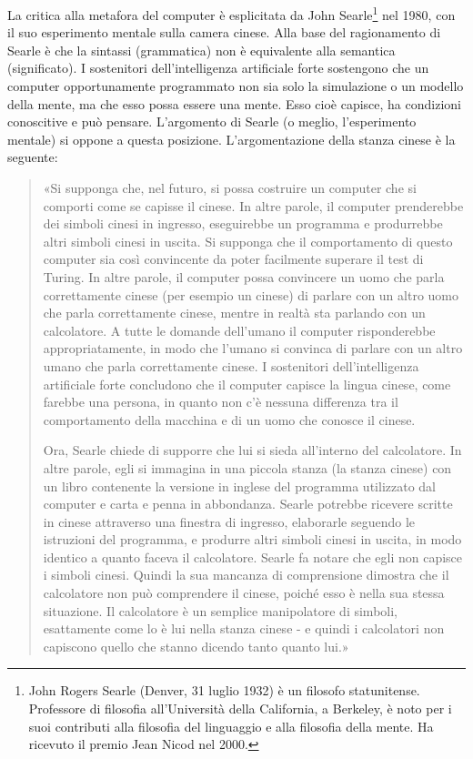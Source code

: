 La critica alla metafora del computer è esplicitata da John Searle\footnote{John Rogers Searle (Denver, 31 luglio 1932) è un filosofo statunitense. Professore di filosofia all'Università della California, a Berkeley, è noto per i suoi contributi alla filosofia del linguaggio e alla filosofia della mente. Ha ricevuto il premio Jean Nicod nel 2000.} nel 1980, con il suo esperimento mentale sulla camera cinese. Alla base del ragionamento di Searle è che la sintassi (grammatica) non è equivalente alla semantica (significato). I sostenitori dell'intelligenza artificiale forte sostengono che un computer opportunamente programmato non sia solo la simulazione o un modello della mente, ma che esso possa essere una mente. Esso cioè capisce, ha condizioni conoscitive e può pensare. L'argomento di Searle (o meglio, l'esperimento mentale) si oppone a questa posizione. L'argomentazione della stanza cinese è la seguente:

\begin{quotation}\small
  «Si supponga che, nel futuro, si possa costruire un computer che si comporti come se capisse il cinese. In altre parole, il computer prenderebbe dei simboli cinesi in ingresso, eseguirebbe un programma e produrrebbe altri simboli cinesi in uscita. Si supponga che il comportamento di questo computer sia così convincente da poter facilmente superare il test di Turing. In altre parole, il computer possa convincere un uomo che parla correttamente cinese (per esempio un cinese) di parlare con un altro uomo che parla correttamente cinese, mentre in realtà sta parlando con un calcolatore. A tutte le domande dell'umano il computer risponderebbe appropriatamente, in modo che l'umano si convinca di parlare con un altro umano che parla correttamente cinese. I sostenitori dell'intelligenza artificiale forte concludono che il computer capisce la lingua cinese, come farebbe una persona, in quanto non c'è nessuna differenza tra il comportamento della macchina e di un uomo che conosce il cinese.

Ora, Searle chiede di supporre che lui si sieda all'interno del calcolatore. In altre parole, egli si immagina in una piccola stanza (la stanza cinese) con un libro contenente la versione in inglese del programma utilizzato dal computer e carta e penna in abbondanza. Searle potrebbe ricevere scritte in cinese attraverso una finestra di ingresso, elaborarle seguendo le istruzioni del programma, e produrre altri simboli cinesi in uscita, in modo identico a quanto faceva il calcolatore. Searle fa notare che egli non capisce i simboli cinesi. Quindi la sua mancanza di comprensione dimostra che il calcolatore non può comprendere il cinese, poiché esso è nella sua stessa situazione. Il calcolatore è un semplice manipolatore di simboli, esattamente come lo è lui nella stanza cinese - e quindi i calcolatori non capiscono quello che stanno dicendo tanto quanto lui.»
\end{quotation}

